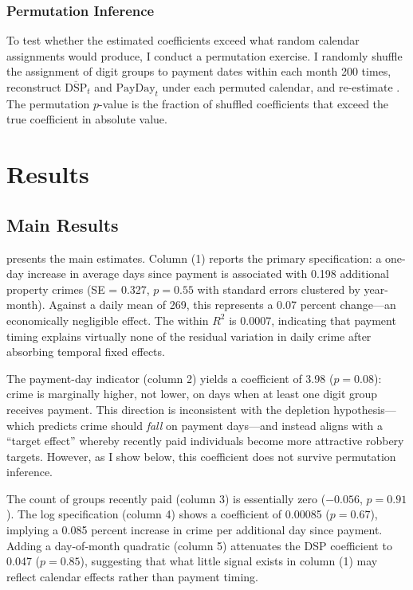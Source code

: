 \documentclass[12pt]{article}
\begin{document}
\subsubsection*{Permutation Inference} To test whether the estimated coefficients exceed what random calendar assignments would produce, I conduct a permutation exercise. I randomly shuffle the assignment of digit groups to payment dates within each month 200 times, reconstruct $\overline{\text{DSP}}_t$ and $\text{PayDay}_t$ under each permuted calendar, and re-estimate . The permutation $p$-value is the fraction of shuffled coefficients that exceed the true coefficient in absolute value.


\section{Results}
\label{sec:results}

\subsection{Main Results}

 presents the main estimates. Column (1) reports the primary specification: a one-day increase in average days since payment is associated with 0.198 additional property crimes (SE = 0.327, $p = 0.55$ with standard errors clustered by year-month). Against a daily mean of 269, this represents a 0.07 percent change---an economically negligible effect. The within $R^2$ is 0.0007, indicating that payment timing explains virtually none of the residual variation in daily crime after absorbing temporal fixed effects.

The payment-day indicator (column 2) yields a coefficient of 3.98 ($p = 0.08$): crime is marginally higher, not lower, on days when at least one digit group receives payment. This direction is inconsistent with the depletion hypothesis---which predicts crime should \textit{fall} on payment days---and instead aligns with a ``target effect'' whereby recently paid individuals become more attractive robbery targets. However, as I show below, this coefficient does not survive permutation inference.

The count of groups recently paid (column 3) is essentially zero ($-0.056$, $p = 0.91$). The log specification (column 4) shows a coefficient of 0.00085 ($p = 0.67$), implying a 0.085 percent increase in crime per additional day since payment. Adding a day-of-month quadratic (column 5) attenuates the DSP coefficient to 0.047 ($p = 0.85$), suggesting that what little signal exists in column (1) may reflect calendar effects rather than payment timing.
\end{document}
